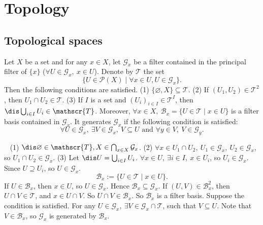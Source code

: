 \chapter{Topology}
\section{Topological spaces}
\begin{propositionenv}
    Let $X$ be a set and for any $x\in X$, let $\mathcal{G}_x$ be a filter contained in the principal filter of $\{x\}$ ($\forall U\in \mathcal{G}_x,\ x\in U$). Denote by $\mathscr{T}$ the set 
    $$\{U\in \mathscr{P}(X) \mid \forall x\in U, U\in\mathcal{G}_x\}.$$
    Then the following conditions are satisfied.
    \newline
    (1) $\{\varnothing, X\} \subseteq \mathscr{T}$.
    \newline
    (2) If $(U_1,U_2)\in \mathscr{T}^2$, then $U_1\cap U_2\in \mathscr{T}$.
    \newline
    (3) If $I$ is a set and $\left(U_i\right)_{i\in I}\in \mathscr{T}^I$, then $\dis \bigcup_{i\in I}U_i\in \mathscr{T}$.
    \newline
    Moreover, $\forall x\in X,\ \mathcal{B}_x=\{U\in \mathscr{T}\mid x\in U\}$ is a filter basis contained in $\mathcal{G}_x$. It generates $\mathcal{G}_x$ if the following condition is satisfied:
    $$\forall U\in \mathcal{G}_x,\ \exists V\in \mathcal{G}_x,\ V\subseteq U \text{ and } \forall y\in V,\ V\in \mathcal{G}_y.$$
\end{propositionenv}
\begin{proofenv}
    \ \newline
    (1) $\dis \varnothing \in \mathscr{T}, X\in \bigcap_{x\in X}\mathcal{G}_x$.
    \newline
    (2) $\forall x\in U_1\cap U_2,\ U_1\in \mathcal{G}_x,\ U_2\in \mathcal{G}_x$, so $U_1\cap U_2\in \mathcal{G}_x$.
    \newline
    (3) Let $\dis U=\bigcup_{i\in I}U_i$. $\forall x\in U,\ \exists i\in I,\ x\in U_i$, so $U_i\in \mathcal{G}_x$. Since $U\supseteq U_i$, so $U\in\mathcal{G}_x$.
    $$\mathcal{B}_x:=\{U\in \mathscr{T}\mid x\in U\}.$$
    If $U\in \mathcal{B}_x$, then $x\in U$, so $U\in \mathcal{G}_x$. Hence $\mathcal{B}_x\subseteq\mathcal{G}_x$. If $(U,V)\in \mathcal{B}_x^2$, then $U\cap V\in \mathscr{T}$, and $x\in U\cap V$. So $U\cap V\in \mathcal{B}_x$. So $\mathcal{B}_x$ is a filter basis. Suppose the condition is satisfied. For any $U\in \mathcal{G}_x,\ \exists V\in \mathcal{G}_x\cap\mathscr{T}$, such that $V\subseteq U$. Note that $V\in \mathcal{B}_x$, so $\mathcal{G}_x$ is generated by $\mathcal{B}_x$.
\end{proofenv}
